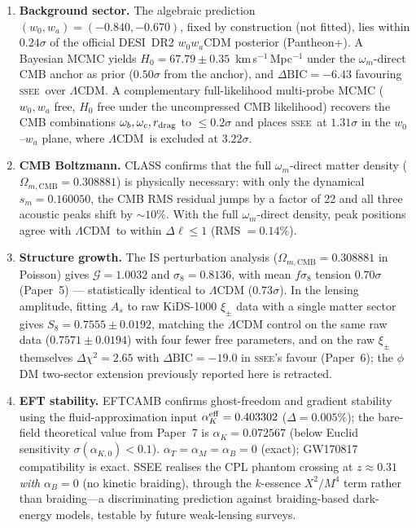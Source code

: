 \documentclass[12pt,a4paper]{article}
\newcommand{\SSEE}{\textsc{ssee}}
\newcommand{\LCDM}{$\Lambda$CDM}
\newcommand{\sm}{s_m}
\newcommand{\OmmCMB}{\Omega_{m,\mathrm{CMB}}}
\newcommand{\wz}{w_0}
\newcommand{\wa}{w_a}
\newcommand{\alphaK}{\alpha_K}
\newcommand{\alphaB}{\alpha_B}
\newcommand{\alphaM}{\alpha_M}
\newcommand{\alphaT}{\alpha_T}
\begin{document}
\begin{enumerate}[leftmargin=*,itemsep=2pt]
\item \textbf{Background sector.} The algebraic prediction
  $(\wz, \wa) = (-0.840, -0.670)$, fixed by construction (not fitted), lies within
  $0.24\sigma$ of the official DESI~DR2 $w_0w_a$CDM posterior (Pantheon+).
  A Bayesian MCMC yields
  $H_0 = 67.79\pm0.35$~km\,s$^{-1}$\,Mpc$^{-1}$ under the $\omega_m$-direct
  CMB anchor as prior ($0.50\sigma$ from the anchor), and $\Delta\mathrm{BIC} = -6.43$ favouring \SSEE\ over \LCDM.
  A complementary full-likelihood multi-probe MCMC ($w_0,w_a$ free, $H_0$
  free under the uncompressed CMB likelihood) recovers the CMB combinations
  $\omega_b,\omega_c,r_{\rm drag}$ to $\le0.2\sigma$ and places \SSEE\ at
  $1.31\sigma$ in the $w_0$--$w_a$ plane, where \LCDM\ is excluded at $3.22\sigma$.

\item \textbf{CMB Boltzmann.} CLASS confirms that the full $\omega_m$-direct
  matter density ($\OmmCMB=0.308881$) is physically necessary: with only the
  dynamical $\sm=0.160050$, the CMB RMS residual jumps by a factor of 22 and
  all three acoustic peaks shift by $\sim 10\%$.
  With the full $\omega_m$-direct density, peak positions agree with \LCDM\ to
  within $\Delta\ell \le 1$ (RMS $= 0.14\%$).

\item \textbf{Structure growth.} The IS perturbation analysis
  ($\OmmCMB=0.308881$ in Poisson) gives $\mathcal{G} = 1.0032$ and $\sigma_8 = 0.8136$,
  with mean $f\sigma_8$ tension $0.70\sigma$ (Paper~5) --- statistically identical
  to $\Lambda$CDM ($0.73\sigma$). In the lensing amplitude, fitting $A_s$ to raw
  KiDS-1000 $\xi_\pm$ data with a single matter sector gives
  $S_8 = 0.7555\pm0.0192$, matching the $\Lambda$CDM control on the same raw data ($0.7571\pm0.0194$) with four fewer free parameters, and on the raw $\xi_\pm$ themselves $\Delta\chi^2=2.65$ with $\Delta\mathrm{BIC}=-19.0$ in \SSEE{}'s favour (Paper~6); the
  $\phi$DM two-sector extension previously reported here is retracted.

\item \textbf{EFT stability.} EFTCAMB confirms ghost-freedom and gradient
  stability using the fluid-approximation input $\alphaK^{\rm eff} = 0.403302$
  ($\Delta = 0.005\%$); the bare-field theoretical value from Paper~7 is
  $\alphaK = 0.072567$ (below Euclid sensitivity $\sigma(\alpha_{K,0}) < 0.1$).
  $\alphaT = \alphaM = \alphaB = 0$ (exact); GW170817 compatibility is exact.
  SSEE realises the CPL phantom crossing at $z \approx 0.31$ \emph{with}
  $\alphaB = 0$ (no kinetic braiding), through the $k$-essence $X^2/M^4$ term
  rather than braiding---a discriminating prediction against braiding-based
  dark-energy models, testable by future weak-lensing surveys.


\end{enumerate}
\end{document}
